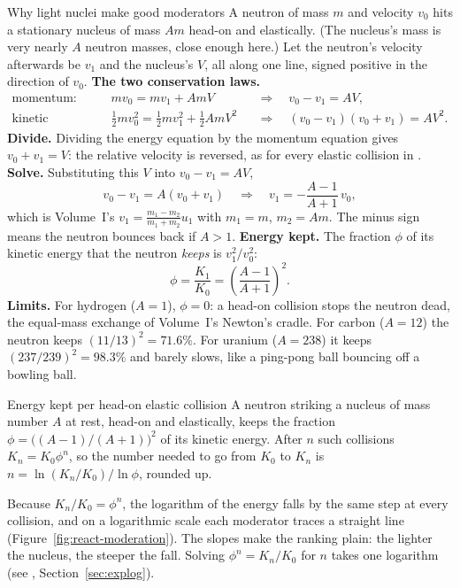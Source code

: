 \begin{derivbox}{Why light nuclei make good moderators}
A neutron of mass $m$ and velocity $v_0$ hits a stationary nucleus of mass $Am$ head-on and elastically.
(The nucleus's mass is very nearly $A$ neutron masses, close enough here.) Let the neutron's velocity
afterwards be $v_1$ and the nucleus's $V$, all along one line, signed positive in the direction of $v_0$.
 \textbf{The two conservation laws.}
\begin{align*}
\text{momentum:}&\quad mv_0=mv_1+AmV &&\Rightarrow\quad v_0-v_1=AV,\\
\text{kinetic energy:}&\quad \tfrac12mv_0^2=\tfrac12mv_1^2+\tfrac12AmV^2 &&\Rightarrow\quad (v_0-v_1)(v_0+v_1)=AV^2 .
\end{align*}
 \textbf{Divide.} Dividing the energy equation by the momentum equation gives $v_0+v_1=V$: the
relative velocity is reversed, as for every elastic collision in .
 \textbf{Solve.} Substituting this $V$ into $v_0-v_1=AV$,
\[
v_0-v_1=A(v_0+v_1)\quad\Longrightarrow\quad v_1=-\frac{A-1}{A+1}\,v_0 ,
\]
which is Volume~I's $v_1=\frac{m_1-m_2}{m_1+m_2}u_1$ with $m_1=m$, $m_2=Am$. The minus sign means the
neutron bounces back if $A>1$.
 \textbf{Energy kept.} The fraction $\phi$ of its kinetic energy that the neutron \emph{keeps}
is $v_1^2/v_0^2$:
\begin{equation}\label{eq:react-phi}
\boxed{\phi=\frac{K_1}{K_0}=\left(\frac{A-1}{A+1}\right)^2 .}
\end{equation}
 \textbf{Limits.} For hydrogen ($A=1$), $\phi=0$: a head-on collision stops the neutron dead,
the equal-mass exchange of Volume~I's Newton's cradle. For carbon ($A=12$) the neutron keeps
$(11/13)^2=71.6\%$. For uranium ($A=238$) it keeps $(237/239)^2=98.3\%$ and barely slows, like a
ping-pong ball bouncing off a bowling ball.
\end{derivbox}

\begin{keybox}{Energy kept per head-on elastic collision}
A neutron striking a nucleus of mass number $A$ at rest, head-on and elastically, keeps the fraction
$\phi=\big((A-1)/(A+1)\big)^2$ of its kinetic energy. After $n$ such collisions $K_n=K_0\phi^n$, so the
number needed to go from $K_0$ to $K_n$ is $n=\ln(K_n/K_0)/\ln\phi$, rounded up.
\end{keybox}

Because $K_n/K_0=\phi^n$, the logarithm of the energy falls by the same step at every collision, and on a
logarithmic scale each moderator traces a straight line (Figure~\ref{fig:react-moderation}). The slopes
make the ranking plain: the lighter the nucleus, the steeper the fall. Solving
$\phi^n=K_n/K_0$ for $n$ takes one logarithm (see , Section~\ref{sec:explog}).

